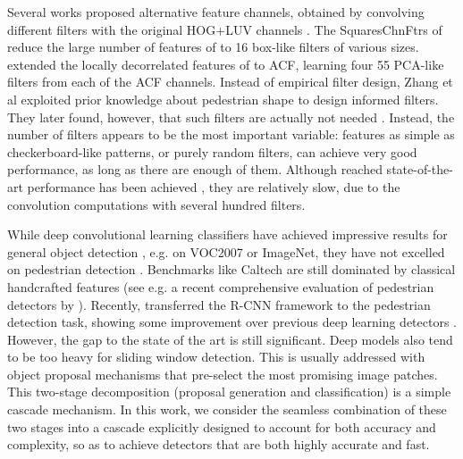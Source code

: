 \documentclass[10pt,twocolumn,letterpaper]{article}
\begin{document}
Several works proposed alternative feature channels, obtained
by convolving different filters with the original HOG+LUV channels  \cite{DBLP:conf/cvpr/ZhangBC14,DBLP:journals/corr/ZhangBS15,
DBLP:conf/cvpr/BenensonMTG13,DBLP:conf/nips/NamDH14}.
The SquaresChnFtrs of \cite{DBLP:conf/cvpr/BenensonMTG13} reduce the
large number of features of
\cite{DBLP:conf/bmvc/DollarTPB09,DBLP:journals/ijcv/ViolaJ04} to
16 box-like filters of various sizes.
\cite{DBLP:conf/nips/NamDH14} extended the locally decorrelated
features of \cite{DBLP:conf/eccv/HariharanMR12} to ACF,
learning four 55 PCA-like filters from each of the ACF
channels. Instead of empirical filter design, Zhang et
al \cite{DBLP:conf/cvpr/ZhangBC14} exploited prior knowledge
about pedestrian shape to design informed filters. They later found, however,
that such filters are actually not
needed \cite{DBLP:journals/corr/ZhangBS15}. Instead, the number of filters
appears to be the most important variable: features as simple as
checkerboard-like patterns, or purely random filters, can achieve very
good performance, as long as there are enough of them. Although reached state-of-the-art
performance has been achieved \cite{DBLP:conf/eccv/PaisitkriangkraiSH14,
DBLP:journals/corr/ZhangBS15}, they are relatively slow, due to the convolution computations with several hundred filters.

While deep convolutional learning classifiers have achieved impressive results for general object detection
\cite{DBLP:conf/cvpr/GirshickDDM14,DBLP:conf/eccv/HeZR014}, e.g.
on VOC2007 or ImageNet, they have not excelled on pedestrian
detection \cite{DBLP:conf/cvpr/SermanetKCL13,DBLP:conf/iccv/OuyangW13}. Benchmarks like Caltech
\cite{DBLP:journals/pami/DollarWSP12} are still dominated by
classical handcrafted features (see e.g. a recent comprehensive evaluation of
pedestrian detectors by \cite{Benenson2014Eccvw}). Recently,
\cite{DBLP:journals/corr/HosangOBS15} transferred the R-CNN
framework to the pedestrian detection task, showing some improvement over
previous deep learning detectors \cite{DBLP:conf/cvpr/SermanetKCL13,DBLP:conf/iccv/OuyangW13}. However, the gap to the state of the art is still
significant. Deep models also tend to be too heavy for sliding window
detection. This is usually addressed with object proposal
mechanisms \cite{DBLP:conf/cvpr/GirshickDDM14,DBLP:conf/iccv/WangYZL13,
DBLP:journals/corr/HosangOBS15} that pre-select the most promising image
patches. This two-stage decomposition (proposal generation and
classification) is a simple cascade mechanism. In this work, we consider the
seamless combination of these two stages into a cascade explicitly
designed to account for both accuracy and complexity, so as to achieve
detectors that are both highly accurate and fast.
\end{document}
